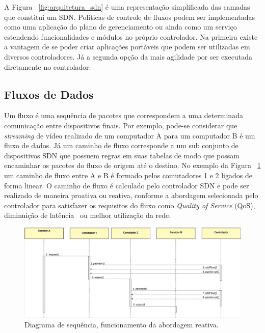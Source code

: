 A Figura ~\ref{fig:arquitetura_sdn} é uma representação simplificada das camadas que constitui um SDN. Políticas de controle de fluxos podem ser implementadas como uma aplicação do plano de gerenciamento ou ainda como um serviço estendendo funcionalidades e módulos no próprio controlador. Na primeira existe a vantagem de se poder criar aplicações portáveis que podem ser utilizadas em diversos controladores. Já a segunda opção da mais agilidade por ser executada diretamente no controlador.

\subsection{Fluxos de Dados}

Um fluxo é uma sequência de pacotes que correspondem a uma determinada comunicação entre dispositivos finais. Por exemplo, pode-se considerar que \textit{streaming} de vídeo realizado de um computador A para um computador B é um fluxo de dados. Já um caminho de fluxo corresponde a um sub conjunto de dispositivos SDN que possuem  regras em suas tabelas de modo que possam encaminhar os pacotes do fluxo de origem até o destino. 
No exemplo da Figura ~\ref{fig:reativo} um caminho de fluxo entre A e B é formado pelos comutadores 1 e 2 ligados de forma linear.
O caminho de fluxo é calculado pelo controlador SDN e pode ser realizado de maneira proativa ou reativa, conforme a abordagem selecionada pelo controlador para satisfazer os requisitos do fluxo como \emph{Quality of Service} (QoS), diminuição de latência~\cite{paulo:2016} ou melhor utilização da rede.
\begin{figure}[!htb]
	\caption{\label{fig:reativo}Diagrama de sequência, funcionamento da abordagem reativa.}
	\begin{center}
	    \includegraphics[scale=0.45]{imagens/Reativo.jpg}
	\end{center}
\end{figure}
